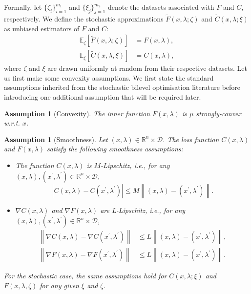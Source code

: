 \documentclass[11pt, twoside]{report}
\newtheorem{assumption}[theorem]{Assumption}
\begin{document}
Formally, let $\{\zeta_i\}_{i=1}^{m_1}$ and $\{\xi_j\}_{j=1}^{m_2}$ denote the datasets associated with $F$ and $C$, respectively. 
We define the stochastic approximations $\tilde{F}(x, \lambda; \zeta)$ and $\tilde{C}(x, \lambda; \xi)$ as unbiased estimators of $F$ and $C$:
\begin{align*}
    \mathbb{E}_{\zeta}[\tilde{F}\left(x, \lambda ; \zeta\right)] &= F\left(x, \lambda\right), \\
    \mathbb{E}_{\xi}[\tilde{C}(x,\lambda,\xi)] &= C(x,\lambda),
\end{align*}
where $\zeta$ and $\xi$ are drawn uniformly at random from their respective datasets. Let us first make some convexity assumptions. We first state the standard assumptions inherited from the stochastic bilevel optimisation literature before introducing one additional assumption that will be required later.



\begin{assumption}[Convexity] \label{conv_ass}
    The inner function $F(x, \lambda)$ is $\mu$ strongly-convex w.r.t. $x$.
\end{assumption}

\begin{assumption}[Smoothness] \label{smo_ass}
Let $(x,\lambda) \in \mathbb{R}^{n} \times \mathcal{D}$. The loss function $C(x,\lambda)$ and $F(x,\lambda)$ satisfy the following smoothness assumptions:
\begin{itemize}
    \item The function $C(x,\lambda)$ is $M$-Lipschitz, i.e., for any $(x,\lambda), (x^{\prime},\lambda^{\prime}) \in \mathbb{R}^{n} \times \mathcal{D}$,
$$
\left|C(x,\lambda)-C(x^{\prime},\lambda^{\prime})\right| \leq M\left\|(x,\lambda)-(x^{\prime},\lambda^{\prime})\right\| .
$$
    \item $\nabla C(x,\lambda)$ and $\nabla F(x,\lambda)$ are L-Lipschitz, i.e., for any $(x,\lambda), (x^{\prime},\lambda^{\prime}) \in \mathbb{R}^{n} \times \mathcal{D}$,
$$
\begin{aligned}
\left\|\nabla C(x,\lambda)-\nabla C(x^{\prime},\lambda^{\prime})\right\| & \leq L\left\|(x,\lambda)-(x^{\prime},\lambda^{\prime})\right\|, \\
\left\|\nabla F(x,\lambda)-\nabla F(x^{\prime},\lambda^{\prime})\right\| & \leq L\left\|(x,\lambda)-(x^{\prime},\lambda^{\prime})\right\| .
\end{aligned}
$$
\end{itemize}
For the stochastic case, the same assumptions hold for $C(x,\lambda ; \xi)$ and $F(x,\lambda, \zeta)$ for any given $\xi$ and $\zeta$.
\end{assumption}
\end{document}
